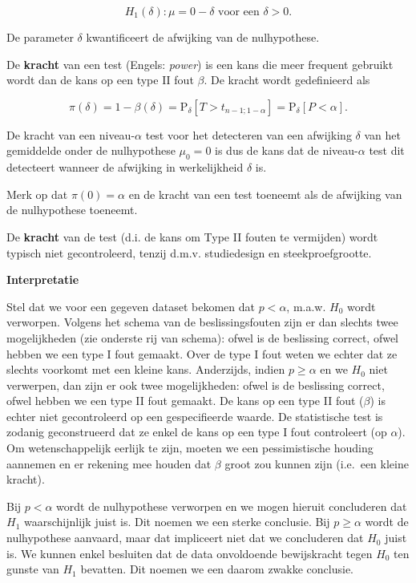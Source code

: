 \documentclass[
  12pt,dutch,coursenotes]{book}
\theoremstyle{definition}
\theoremstyle{definition}
\theoremstyle{definition}
\theoremstyle{remark}
\begin{document}
\[H_1(\delta): \mu=0-\delta \text{ voor een }\delta>0.\]

De parameter \(\delta\) kwantificeert de afwijking van de nulhypothese.

De \textbf{kracht} van een test (Engels: \emph{power}) is een kans die meer frequent gebruikt wordt dan de kans op een type II fout \(\beta\). De kracht wordt gedefinieerd als

\[\pi(\delta) = 1-\beta(\delta) = \text{P}_\delta\left[T>t_{n-1;1-\alpha}\right]=\text{P}_\delta\left[P<\alpha\right].\]

De kracht van een niveau-\(\alpha\) test voor het detecteren van een afwijking \(\delta\) van het gemiddelde onder de nulhypothese \(\mu_0=0\) is dus de kans dat de niveau-\(\alpha\) test dit detecteert wanneer de afwijking in werkelijkheid \(\delta\) is.

Merk op dat \(\pi(0)=\alpha\) en de kracht van een test toeneemt als de afwijking van de nulhypothese toeneemt.

De \textbf{kracht} van de test (d.i. de kans om Type II fouten te vermijden) wordt typisch niet gecontroleerd, tenzij d.m.v. studiedesign en steekproefgrootte.

\textbf{Interpretatie}

Stel dat we voor een gegeven dataset bekomen dat \(p<\alpha\), m.a.w. \(H_0\) wordt verworpen. Volgens het schema van de beslissingsfouten zijn er dan slechts twee mogelijkheden (zie onderste rij van schema): ofwel is de beslissing correct, ofwel hebben we een type I fout gemaakt. Over de type I fout weten we echter dat ze slechts voorkomt met een kleine kans.
Anderzijds, indien \(p\geq \alpha\) en we \(H_0\) niet verwerpen, dan zijn er ook twee mogelijkheden: ofwel is de beslissing correct, ofwel hebben we een type II fout gemaakt. De kans op een type II fout (\(\beta\)) is echter niet gecontroleerd op een gespecifieerde waarde. De statistische test is zodanig geconstrueerd dat ze enkel de kans op een type I fout controleert (op \(\alpha\)). Om wetenschappelijk eerlijk te zijn, moeten we een pessimistische houding aannemen en er rekening mee houden dat \(\beta\) groot zou kunnen zijn (i.e.~een kleine kracht).

Bij \(p < \alpha\) wordt de nulhypothese verworpen en we mogen hieruit concluderen dat \(H_1\) waarschijnlijk juist is. Dit noemen we een sterke conclusie.
Bij \(p\geq \alpha\) wordt de nulhypothese aanvaard, maar dat impliceert niet dat we concluderen dat \(H_0\) juist is. We kunnen enkel besluiten dat de data onvoldoende bewijskracht tegen \(H_0\) ten gunste van \(H_1\) bevatten. Dit noemen we een daarom zwakke conclusie.
\end{document}
